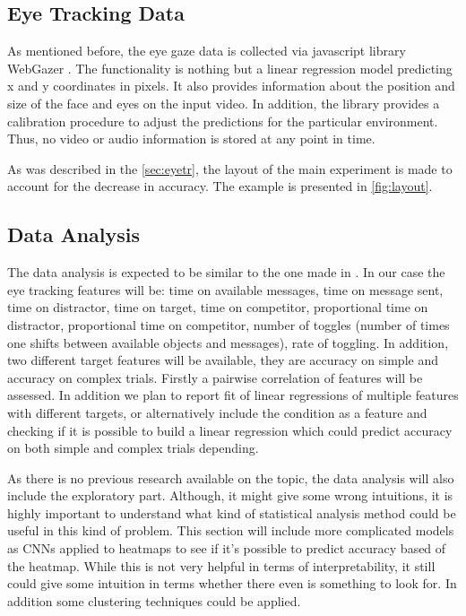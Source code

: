 \documentclass[11pt,a4paper]{article}
\begin{document}
\subsection{Eye Tracking Data}
As mentioned before, the eye gaze data is collected via javascript library WebGazer \citep{wegbazer}. The functionality is nothing but a linear regression model predicting x and y coordinates in pixels. It also provides information about the position and size of the face and eyes on the input video. In addition, the library provides a calibration procedure to adjust the predictions for the particular environment. Thus, no video or audio information is stored at any point in time. 

As was described in the \autoref{sec:eyetr}, the layout of the main experiment is made to account for the decrease in accuracy. The example is presented in \autoref{fig:layout}.
\subsection{Data Analysis}
The data analysis is expected to be similar to the one made in \cite{Vigneau_2006}. In our case the eye tracking features will be: time on available messages, time on message sent, time on distractor, time on target, time on competitor, proportional time on distractor, proportional time on competitor, number of toggles (number of times one shifts between available objects and messages), rate of toggling. In addition, two different target features will be available, they are accuracy on simple and accuracy on complex trials. Firstly a pairwise correlation of features will be assessed. In addition we plan to report fit of  linear regressions of multiple features with different targets, or alternatively include the condition as a feature and checking if it is possible to build a linear regression which could predict accuracy on both simple and complex trials depending.

As there is no previous research available on the topic, the data analysis will also include the exploratory part. Although, it might give some wrong intuitions, it is highly important to understand what kind of statistical analysis method could be useful in this kind of problem. This section will include more complicated models as CNNs applied to heatmaps to see if it's possible to predict accuracy based of the heatmap. While this is not very helpful in terms of interpretability, it still could give some intuition in terms whether there even is something to look for. In addition some clustering techniques could be applied. 
\end{document}

